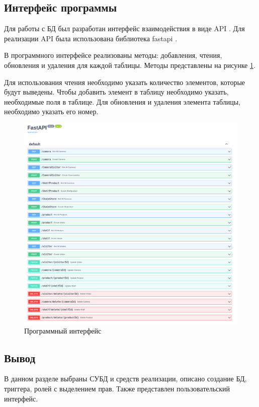 \subsection{Интерфейс программы}

Для работы с БД был разработан интерфейс взаимодействия в виде API \cite{API}.
Для реализации API была использована библиотека fastapi \cite{fastapi}.

В программного интерфейсе реализованы методы: добавления, чтения, обновления и
удаления для каждой таблицы.
Методы представлены на рисунке \ref{fig:api}.

Для использования чтения необходимо указать количество элементов, которые будут
выведены.
Чтобы добавить элемент в таблицу необходимо указать, необходимые поля в
таблице.
Для обновления и удаления элемента таблицы, необходимо указать его номер.

\begin{figure}[ht!]
    \centering
    \includegraphics[width=1\linewidth]{assets/images/api.png}
    \caption{Программный интерфейс}
    \label{fig:api}
\end{figure}
\FloatBarrier

\subsection*{Вывод}

В данном разделе выбраны СУБД и средств реализации, описано создание БД,
триггера, ролей с выделением прав.
Также представлен пользовательский интерфейс.